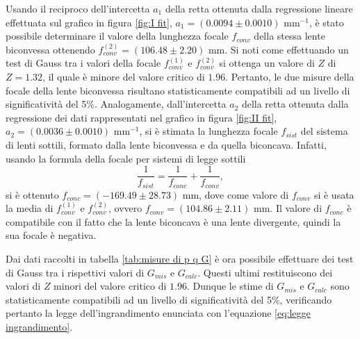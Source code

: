 \documentclass{article}
\begin{document}
Usando il reciproco dell'intercetta $a_1$ della retta ottenuta dalla regressione lineare effettuata sul grafico in figura \ref{fig:I fit}, $a_1=(0.0094\pm0.0010)$ mm$^{-1}$, è stato possibile determinare il valore della lunghezza focale $f_{conv}$ della stessa lente biconvessa ottenendo $f_{conv}^{(2)}=(106.48\pm2.20)$ mm. Si noti come effettuando un test di Gauss tra i valori della focale $f_{conv}^{(1)}$ e $f_{conv}^{(2)}$ si ottenga un valore di $Z$ di $Z=1.32$, il quale è minore del valore critico di $1.96$. Pertanto, le due misure della focale della lente biconvessa risultano statisticamente compatibili ad un livello di significatività del 5\%. Analogamente, dall'intercetta $a_2$ della retta ottenuta dalla regressione dei dati rappresentati nel grafico in figura \ref{fig:II fit}, $a_2=(0.0036\pm0.0010)$ mm$^{-1}$, si è stimata la lunghezza focale $f_{sist}$ del sistema di lenti sottili, formato dalla lente biconvessa e da quella biconcava. Infatti, usando la formula della focale per sistemi di legge sottili
\begin{equation}
    \label{eq:focale sistemi}
    \frac{1}{f_{sist}}=\frac{1}{f_{conc}}+\frac{1}{f_{conv}},
\end{equation}
si è ottenuto $f_{conc}=(-169.49\pm28.73)$ mm, dove come valore di $f_{conv}$ si è usata la media di $f_{conv}^{(1)}$ e $f_{conv}^{(2)}$, ovvero $f_{conv}=(104.86\pm2.11)$ mm. Il valore di $f_{conc}$ è compatibile con il fatto che la lente biconcava è una lente divergente, quindi la sua focale è negativa. 

Dai dati raccolti in tabella \ref{tab:misure di p q G} è ora possibile effettuare dei test di Gauss tra i rispettivi valori di $G_{mis}$ e $G_{calc}$. Questi ultimi restituiscono dei valori di $Z$ minori del valore critico di $1.96$. Dunque le stime di $G_{mis}$ e $G_{calc}$ sono statisticamente compatibili ad un livello di significatività del 5\%, verificando pertanto la legge dell'ingrandimento enunciata con l'equazione \eqref{eq:legge ingrandimento}.
\end{document}
